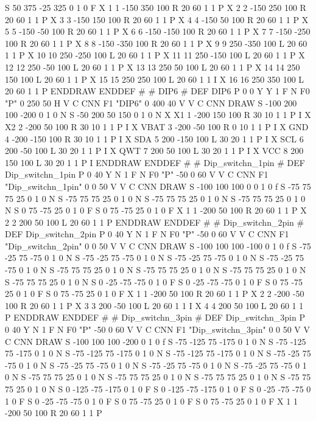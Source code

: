 S 50 375 -25 325 0 1 0 F
X 1 1 -150 350 100 R 20 60 1 1 P
X 2 2 -150 250 100 R 20 60 1 1 P
X 3 3 -150 150 100 R 20 60 1 1 P
X 4 4 -150 50 100 R 20 60 1 1 P
X 5 5 -150 -50 100 R 20 60 1 1 P
X 6 6 -150 -150 100 R 20 60 1 1 P
X 7 7 -150 -250 100 R 20 60 1 1 P
X 8 8 -150 -350 100 R 20 60 1 1 P
X 9 9 250 -350 100 L 20 60 1 1 P
X 10 10 250 -250 100 L 20 60 1 1 P
X 11 11 250 -150 100 L 20 60 1 1 P
X 12 12 250 -50 100 L 20 60 1 1 P
X 13 13 250 50 100 L 20 60 1 1 P
X 14 14 250 150 100 L 20 60 1 1 P
X 15 15 250 250 100 L 20 60 1 1 I
X 16 16 250 350 100 L 20 60 1 1 P
ENDDRAW
ENDDEF
#
# DIP6
#
DEF DIP6 P 0 0 Y Y 1 F N
F0 "P" 0 250 50 H V C CNN
F1 "DIP6" 0 400 40 V V C CNN
DRAW
S -100 200 100 -200 0 1 0 N
S -50 200 50 150 0 1 0 N
X X1 1 -200 150 100 R 30 10 1 1 P I
X X2 2 -200 50 100 R 30 10 1 1 P I
X VBAT 3 -200 -50 100 R 0 10 1 1 P I
X GND 4 -200 -150 100 R 30 10 1 1 P I
X SDA 5 200 -150 100 L 30 20 1 1 P I
X SCL 6 200 -50 100 L 30 20 1 1 P I
X QWT 7 200 50 100 L 30 20 1 1 P I
X VCC 8 200 150 100 L 30 20 1 1 P I
ENDDRAW
ENDDEF
#
# Dip_switchn_1pin
#
DEF Dip_switchn_1pin P 0 40 Y N 1 F N
F0 "P" -50 0 60 V V C CNN
F1 "Dip_switchn_1pin" 0 0 50 V V C CNN
DRAW
S -100 100 100 0 0 1 0 f
S -75 75 75 25 0 1 0 N
S -75 75 75 25 0 1 0 N
S -75 75 75 25 0 1 0 N
S -75 75 75 25 0 1 0 N
S 0 75 -75 25 0 1 0 F
S 0 75 -75 25 0 1 0 F
X 1 1 -200 50 100 R 20 60 1 1 P
X 2 2 200 50 100 L 20 60 1 1 P
ENDDRAW
ENDDEF
#
# Dip_switchn_2pin
#
DEF Dip_switchn_2pin P 0 40 Y N 1 F N
F0 "P" -50 0 60 V V C CNN
F1 "Dip_switchn_2pin" 0 0 50 V V C CNN
DRAW
S -100 100 100 -100 0 1 0 f
S -75 -25 75 -75 0 1 0 N
S -75 -25 75 -75 0 1 0 N
S -75 -25 75 -75 0 1 0 N
S -75 -25 75 -75 0 1 0 N
S -75 75 75 25 0 1 0 N
S -75 75 75 25 0 1 0 N
S -75 75 75 25 0 1 0 N
S -75 75 75 25 0 1 0 N
S 0 -25 -75 -75 0 1 0 F
S 0 -25 -75 -75 0 1 0 F
S 0 75 -75 25 0 1 0 F
S 0 75 -75 25 0 1 0 F
X 1 1 -200 50 100 R 20 60 1 1 P
X 2 2 -200 -50 100 R 20 60 1 1 P
X 3 3 200 -50 100 L 20 60 1 1 I
X 4 4 200 50 100 L 20 60 1 1 P
ENDDRAW
ENDDEF
#
# Dip_switchn_3pin
#
DEF Dip_switchn_3pin P 0 40 Y N 1 F N
F0 "P" -50 0 60 V V C CNN
F1 "Dip_switchn_3pin" 0 0 50 V V C CNN
DRAW
S -100 100 100 -200 0 1 0 f
S -75 -125 75 -175 0 1 0 N
S -75 -125 75 -175 0 1 0 N
S -75 -125 75 -175 0 1 0 N
S -75 -125 75 -175 0 1 0 N
S -75 -25 75 -75 0 1 0 N
S -75 -25 75 -75 0 1 0 N
S -75 -25 75 -75 0 1 0 N
S -75 -25 75 -75 0 1 0 N
S -75 75 75 25 0 1 0 N
S -75 75 75 25 0 1 0 N
S -75 75 75 25 0 1 0 N
S -75 75 75 25 0 1 0 N
S 0 -125 -75 -175 0 1 0 F
S 0 -125 -75 -175 0 1 0 F
S 0 -25 -75 -75 0 1 0 F
S 0 -25 -75 -75 0 1 0 F
S 0 75 -75 25 0 1 0 F
S 0 75 -75 25 0 1 0 F
X 1 1 -200 50 100 R 20 60 1 1 P
